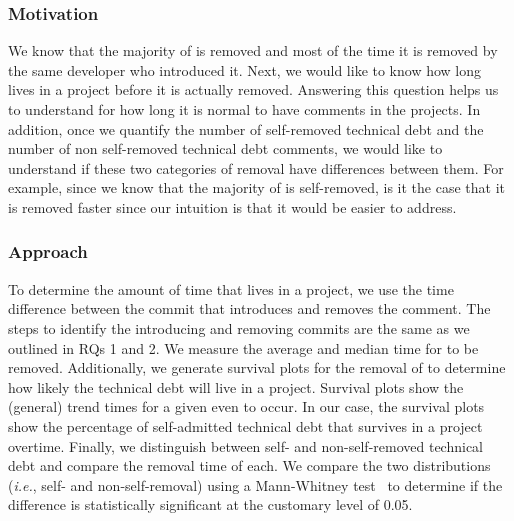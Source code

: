 \subsubsection*{Motivation} We know that the majority of \SATD is removed and most of the time it is removed by the same developer who introduced it. Next, we would like to know how long \SATD lives in a project before it is actually removed. Answering this question helps us to understand for how long it is normal to have \SATD comments in the projects. In addition, once we quantify the number of self-removed technical debt and the number of non self-removed technical debt comments, we would like to understand if these two categories of removal have differences between them. For example, since we know that the majority of \SATD is self-removed, is it the case that it is removed faster since our intuition is that it would be easier to address. 

\subsubsection*{Approach} To determine the amount of time that \SATD lives in a project, we use the time difference between the commit that introduces and removes the \SATD comment. The steps to identify the \SATD introducing and removing commits are the same as we outlined in RQs 1 and 2. We measure the average and median time for \SATD to be removed. Additionally, we generate survival plots for the removal of \SATD to determine how likely the technical debt will live in a project. Survival plots show the (general) trend times for a given even to occur. In our case, the survival plots show the  percentage of self-admitted technical debt that survives in a project overtime. Finally, we distinguish between self- and non-self-removed technical debt and compare the removal time of each. We compare the two distributions (\emph{i.e.}, self- and non-self-removal) using a Mann-Whitney test~\cite{mann1947test} to determine if the difference is statistically significant at the customary level of 0.05.



